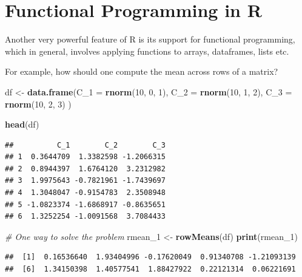 \documentclass[12pt,]{article}
\newenvironment{Shaded}{\begin{snugshade}}{\end{snugshade}}
\newcommand{\KeywordTok}[1]{\textcolor[rgb]{0.13,0.29,0.53}{\textbf{#1}}}
\newcommand{\DataTypeTok}[1]{\textcolor[rgb]{0.13,0.29,0.53}{#1}}
\newcommand{\DecValTok}[1]{\textcolor[rgb]{0.00,0.00,0.81}{#1}}
\newcommand{\StringTok}[1]{\textcolor[rgb]{0.31,0.60,0.02}{#1}}
\newcommand{\CommentTok}[1]{\textcolor[rgb]{0.56,0.35,0.01}{\textit{#1}}}
\newcommand{\NormalTok}[1]{#1}
\begin{document}
\section{Functional Programming in R}\label{functional-programming-in-r}

Another very powerful feature of R is its support for functional
programming, which in general, involves applying functions to arrays,
dataframes, lists etc.

For example, how should one compute the mean across rows of a matrix?

\begin{Shaded}
\begin{Highlighting}[]
\NormalTok{df <-}\StringTok{ }\KeywordTok{data.frame}\NormalTok{(}\DataTypeTok{C_1 =} \KeywordTok{rnorm}\NormalTok{(}\DecValTok{10}\NormalTok{, }\DecValTok{0}\NormalTok{, }\DecValTok{1}\NormalTok{), }
                 \DataTypeTok{C_2 =} \KeywordTok{rnorm}\NormalTok{(}\DecValTok{10}\NormalTok{, }\DecValTok{1}\NormalTok{, }\DecValTok{2}\NormalTok{),}
                 \DataTypeTok{C_3 =} \KeywordTok{rnorm}\NormalTok{(}\DecValTok{10}\NormalTok{, }\DecValTok{2}\NormalTok{, }\DecValTok{3}\NormalTok{)}
\NormalTok{                 )}

\KeywordTok{head}\NormalTok{(df)}
\end{Highlighting}
\end{Shaded}

\begin{verbatim}
##          C_1        C_2        C_3
## 1  0.3644709  1.3382598 -1.2066315
## 2  0.8944397  1.6764120  3.2312982
## 3  1.9975643 -0.7821961 -1.7439697
## 4  1.3048047 -0.9154783  2.3508948
## 5 -1.0823374 -1.6868917 -0.8635651
## 6  1.3252254 -1.0091568  3.7084433
\end{verbatim}

\begin{Shaded}
\begin{Highlighting}[]
\CommentTok{# One way to solve the problem}
\NormalTok{rmean_}\DecValTok{1}\NormalTok{ <-}\StringTok{ }\KeywordTok{rowMeans}\NormalTok{(df)}
\KeywordTok{print}\NormalTok{(rmean_}\DecValTok{1}\NormalTok{)}
\end{Highlighting}
\end{Shaded}

\begin{verbatim}
##  [1]  0.16536640  1.93404996 -0.17620049  0.91340708 -1.21093139
##  [6]  1.34150398  1.40577541  1.88427922  0.22121314  0.06221691
\end{verbatim}
\end{document}
